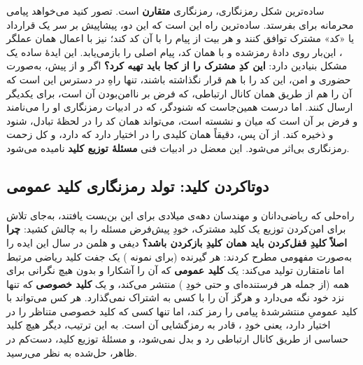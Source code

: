 ساده‌ترین شکل رمزنگاری، رمزنگاری \textbf{متقارن}  است. تصور کنید  می‌خواهد پیامی محرمانه برای  بفرستد. ساده‌ترین راه این است که این دو، پیشاپیش بر سر یک قرارداد یا «کد» مشترک توافق کنند و  هر بیت از پیام را با آن کد  کند؛  نیز با اعمال همان عملگر ، این‌بار روی دادهٔ رمزشده و با همان کد، پیام اصلی را بازمی‌یابد. این ایدهٔ ساده یک مشکل بنیادین دارد: \textbf{این کدِ مشترک را از کجا باید تهیه کرد؟} اگر  و  از پیش، به‌صورت حضوری و امن، این کد را با هم قرار نگذاشته باشند، تنها راهِ در دسترس این است که آن را هم از طریق همان کانال ارتباطی، که فرض بر ناامن‌بودن آن است، برای یکدیگر ارسال کنند. اما درست همین‌جاست که شنودگر، که در ادبیات رمزنگاری او را  می‌نامند و فرض بر آن است که میان  و  نشسته است، می‌تواند همان کد را در لحظهٔ تبادل، شنود و ذخیره کند. از آن پس،  دقیقاً همان کلیدی را در اختیار دارد که  دارد، و کل زحمت رمزنگاری بی‌اثر می‌شود. این معضل در ادبیات فنی \textbf{مسئلهٔ توزیع کلید}  نامیده می‌شود.

\subsection{دوتاکردن کلید: تولد رمزنگاری کلید عمومی}

راه‌حلی که ریاضی‌دانان و مهندسان دهه‌ی  میلادی برای این بن‌بست یافتند، به‌جای تلاش برای امن‌کردن توزیع یک کلید مشترک، خودِ پیش‌فرض مسئله را به چالش کشید: \textbf{چرا اصلاً کلیدِ قفل‌کردن باید همان کلیدِ بازکردن باشد؟} دیفی و هلمن در سال  \Cite{diffiehellman1976} این ایده را به‌صورت مفهومی مطرح کردند: هر گیرنده (برای نمونه ) یک جفت کلید ریاضی مرتبط اما نامتقارن تولید می‌کند: یک \textbf{کلید عمومی}  که آن را آشکارا و بدون هیچ نگرانی برای همه (از جمله هر فرستنده‌ای و حتی خودِ ) منتشر می‌کند، و یک \textbf{کلید خصوصی}  که تنها نزد خود نگه می‌دارد و هرگز آن را با کسی به اشتراک نمی‌گذارد. هر کس می‌تواند با کلید عمومیِ منتشرشدهٔ  پیامی را رمز کند، اما تنها کسی که کلید خصوصی متناظر را در اختیار دارد، یعنی خودِ ، قادر به رمزگشایی آن است. به این ترتیب، دیگر هیچ کلید حساسی از طریق کانال ارتباطی رد و بدل نمی‌شود، و مسئلهٔ توزیع کلید، دست‌کم در ظاهر، حل‌شده به نظر می‌رسید.

